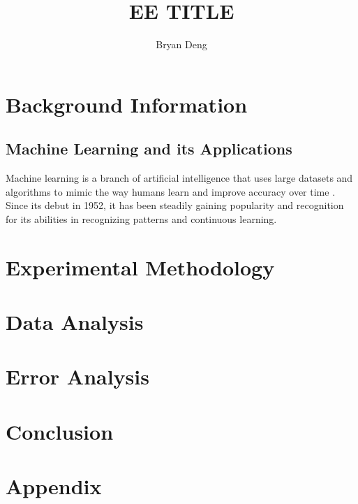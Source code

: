 \documentclass[12pt]{article}
\title{EE TITLE}
\author{Bryan Deng}
\begin{document}
\maketitle
\newpage
\tableofcontents
\newpage

\section{Background Information}

\subsection{Machine Learning and its Applications}

Machine learning is a branch of artificial intelligence that uses large datasets and algorithms to mimic the way humans learn and improve accuracy over time \cite{whatisml}. Since its debut in 1952, it has been steadily gaining popularity and recognition for its abilities in recognizing patterns and continuous learning.

\section{Experimental Methodology}

\section{Data Analysis}

\section{Error Analysis}

\section{Conclusion}

\section{Appendix}



\end{document}
